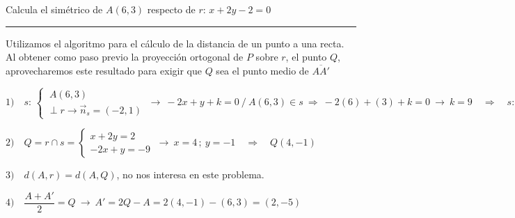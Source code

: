\begin{miejercicio}

Calcula el simétrico de $A(6,3)$ respecto de $r:\, x+2y-2=0$

\rule{250pt}{0.1pt} 

\vspace{2mm}Utilizamos el algoritmo para el cálculo de la distancia de un punto a una recta. Al obtener como paso previo la proyección ortogonal de $P$ sobre $r$, el punto $Q$, aprovecharemos este resultado para exigir que $Q$ sea el punto medio de $\overline{AA'}$

\vspace{2mm} $1)\quad s:\, \begin{cases} \ A(6,3) \\ \perp r \to \vec n_s=(-2,1) \end{cases} \ \to \ -2x+y+k=0 \ / \ A(6,3)\in s \ \Rightarrow \ -2(6)+(3)+k=0 \ \to \ k=9 \quad \Rightarrow \quad s:\ -2x+y+9=0$

\vspace{2mm} $2)\quad Q=r\cap s = \begin{cases} x+2y=2 \\ -2x+y=-9 \end{cases} \ \to \ x=4 \, ; \ y=-1 \quad \Rightarrow \quad Q(4,-1)$

\vspace{2mm} $3) \quad d(A,r)=d(A,Q)$, no nos interesa en este problema.

\vspace{4mm} $4)\quad \dfrac{A+A'}{2}=Q \ \to \ A'=2Q-A=2(4,-1)-(6,3)=(2,-5)$

\end{miejercicio}


